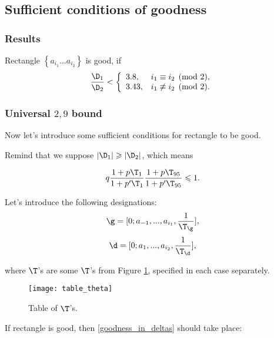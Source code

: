 \subsection{Sufficient conditions of goodness}

\subsubsection{Results}

Rectangle $\left\{ a_{i_1} ... a_{i_2} \right\}$ is good, if
\begin{equation}\label{goodness_condition}
	\dfrac{\D_1}{\D_2} <
	\left\{\begin{array}{ll}
		3.8, & i_1 \equiv i_2 \pmod 2,\\
		3.43, & i_1 \not\equiv i_2 \pmod 2.
	\end{array}\right.
\end{equation}

\subsubsection{Universal $2,9$ bound}

Now let's introduce some sufficient conditions for rectangle to be good.


Remind that we suppose $|\D_1| \geqslant |\D_2|$, which means

\begin{equation*}
	q
	\dfrac{1 + p \T_{1}}{1 + p' \T_{1}}
	\dfrac{1 + p \T_{95}}{1 + p' \T_{95}} \leqslant 1.
\end{equation*}

Let's introduce the following designations:
\begin{equation*}
	\g = [0; a_{-1}, ..., a_{i_1}, \frac{1}{\T_\g}],
\end{equation*}
\begin{equation*}
	\d = [0; a_{1}, ..., a_{i_2}, \frac{1}{\T_\d}],
\end{equation*}

where $\T$'s are some $\T$'s from Figure \ref{table_theta},
specified in each case separately.

\begin{figure}[p]
	\texttt{[image: table\_theta]}
	\caption{Table of $\T$'s.}
	\label{table_theta}
\end{figure}

If rectangle is good, then \ref{goodness_in_deltas} should take place:

